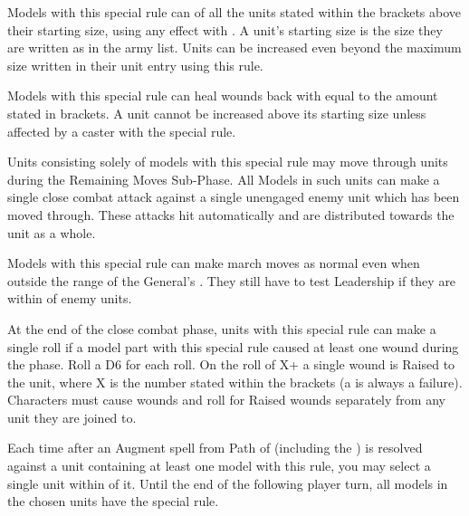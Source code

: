 
Models with this special rule can \raisewounds{} of all the units stated within the brackets above their starting size, using any effect with \raisewounds{}. A unit's starting size is the size they are written as in the army list. Units can be increased even beyond the maximum size written in their unit entry using this rule.


Models with this special rule can heal wounds back with \necromancysignaturespell{} equal to the amount stated in brackets. A unit cannot be increased above its starting size unless affected by a caster with the \awaken{} special rule.

\armyspecialruleentry{\reaper}

Units consisting solely of models with this special rule may move through units during the Remaining Moves Sub-Phase. All Models in such units can make a single close combat attack against a single unengaged enemy unit which has been moved through. These attacks hit automatically and are distributed towards the unit as a whole.


Models with this special rule can make march moves as normal even when outside the range of the General's \inspiringpresence{}. They still have to test Leadership if they are within  of enemy units. 

At the end of the close combat phase, units with this special rule can make a single \vampiric{} roll if a model part with this special rule caused at least one wound during the phase. Roll a D6 for each \vampiric{} roll. On the roll of X+ a single wound is Raised to the unit, where X is the number stated within the brackets (a  is always a failure). Characters must cause wounds and roll for Raised wounds separately from any unit they are joined to.

\armyspecialruleentry{\wakethedead}

Each time after an Augment spell from Path of \necromancy{} (including the \necromancyattribute{}) is resolved against a unit containing at least one model with this rule, you may select a single unit within  of it. Until the end of the following player turn, all models in the chosen units have the \lightningreflexes{} special rule.

\armyspecialruleentry{\necromanticaura}

